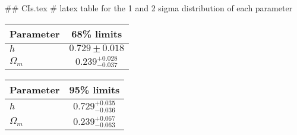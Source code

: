 ## CIs.tex
# latex table for the 1 and 2 sigma distribution of each parameter

\begin{tabular} { l  c}
 Parameter &  68\% limits\\
\hline
{\boldmath$h              $} & $0.729\pm 0.018            $\\
{\boldmath$\Omega_m       $} & $0.239^{+0.028}_{-0.037}   $\\
\hline
\end{tabular}

\begin{tabular} { l  c}
 Parameter &  95\% limits\\
\hline
{\boldmath$h              $} & $0.729^{+0.035}_{-0.036}   $\\
{\boldmath$\Omega_m       $} & $0.239^{+0.067}_{-0.063}   $\\
\hline
\end{tabular}
